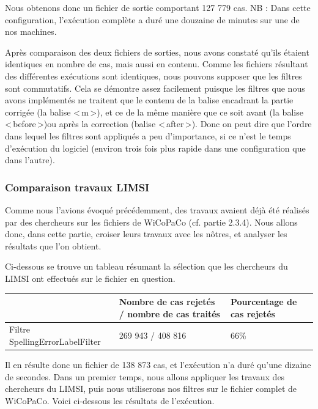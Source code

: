 \documentclass[11pt]{article}
\begin{document}
Nous obtenons donc un fichier de sortie comportant 127 779 cas.
\newline
NB : Dans cette configuration, l'ex\'{e}cution compl\`{e}te a dur\'{e} une douzaine de minutes sur une de nos machines.
\newline
\newline

Apr\`{e}s comparaison des deux fichiers de sorties, nous avons constat\'{e} qu'ils \'{e}taient identiques en nombre de cas, mais aussi en contenu. Comme les fichiers r\'{e}sultant des diff\'{e}rentes ex\'{e}cutions sont identiques, nous pouvons supposer que les filtres sont commutatifs.
Cela se d\'{e}montre assez facilement puisque les filtres que nous avons impl\'{e}ment\'{e}s ne traitent que le contenu de la balise encadrant la partie corrig\'{e}e (la balise <\,m\,>), et ce de la m\^{e}me mani\`{e}re que ce soit avant (la balise <\,before\,>)ou apr\`{e}s la correction (balise <\,after\,>). Donc on peut dire que l'ordre dans lequel les filtres sont appliqu\'{e}s a peu d'importance, si ce n'est le temps d'ex\'{e}cution du logiciel (environ trois fois plus rapide dans une configuration que dans l'autre).


\subsubsection{Comparaison travaux LIMSI}
Comme nous l'avions \'{e}voqu\'{e} pr\'{e}c\'{e}demment, des travaux avaient d\'{e}j\`{a} \'{e}t\'{e} r\'{e}alis\'{e}s par des chercheurs sur les fichiers de WiCoPaCo (cf. partie 2.3.4). Nous allons donc, dans cette partie, croiser leurs travaux avec les n\^{o}tres, et analyser les r\'{e}sultats que l'on obtient.

Ci-dessous se trouve un tableau r\'{e}sumant la s\'{e}lection que les chercheurs du LIMSI ont effectu\'{e}s sur le fichier en question.
\begin{center}
\begin{tabular}{|M{4cm}|M{5cm}|M{6cm}|}
   \hline
    \, &Nombre de cas rejet\'{e}s / nombre de cas trait\'{e}s & Pourcentage de cas rejet\'{e}s \tabularnewline
   \hline
    Filtre SpellingErrorLabelFilter & 269 943 / 408 816 & 66\% \tabularnewline
   \hline
\end{tabular}
\end{center}
Il en r\'{e}sulte donc un fichier de 138 873 cas, et l'ex\'{e}cution n'a dur\'{e} qu'une dizaine de secondes.
\newline
\newline
Dans un premier temps, nous allons appliquer les travaux des chercheurs du LIMSI, puis nous utiliserons nos filtres sur le fichier complet de WiCoPaCo.
Voici ci-dessous les r\'{e}sultats de l'ex\'{e}cution.
\end{document}
